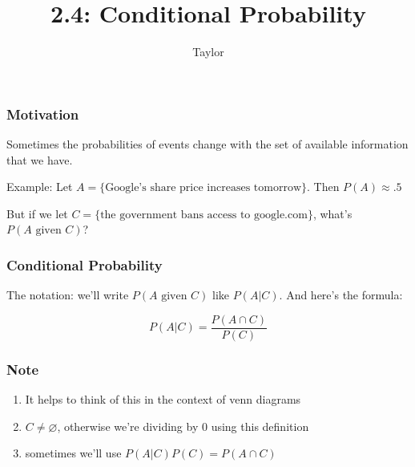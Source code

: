 \documentclass{beamer}
\title["2.4"]{2.4: Conditional Probability}
\author{Taylor}
\institute[UVA] 
{
University of Virginia \\
\medskip
\textit{} 
}
\date{}
\begin{document}

\begin{frame}
\titlepage 
\end{frame}

\begin{frame}
\frametitle{Motivation}

Sometimes the probabilities of events change with the set of available information that we have. 
\newline

Example: Let $A = \{\text{Google's share price increases tomorrow}\}$. Then $P(A) \approx .5$
\newline

But if we let $C = \{\text{the government bans access to google.com}\}$, what's $P(A \text{ given } C)$?
\end{frame}


\begin{frame}
\frametitle{Conditional Probability}

The notation: we'll write  $P(A \text{ given } C)$ like $P(A|C)$. And here's the formula:

\[
P(A|C) = \frac{P(A \cap C)}{P(C)}
\]

\end{frame}



\begin{frame}
\frametitle{Note}

\begin{enumerate}
\item It helps to think of this in the context of venn diagrams
\item $C \neq \varnothing$, otherwise we're dividing by $0$ using this definition
\item sometimes we'll use  $P(A|C)P(C) = P(A \cap C)$

\end{enumerate}


\end{frame}

\end{document}
